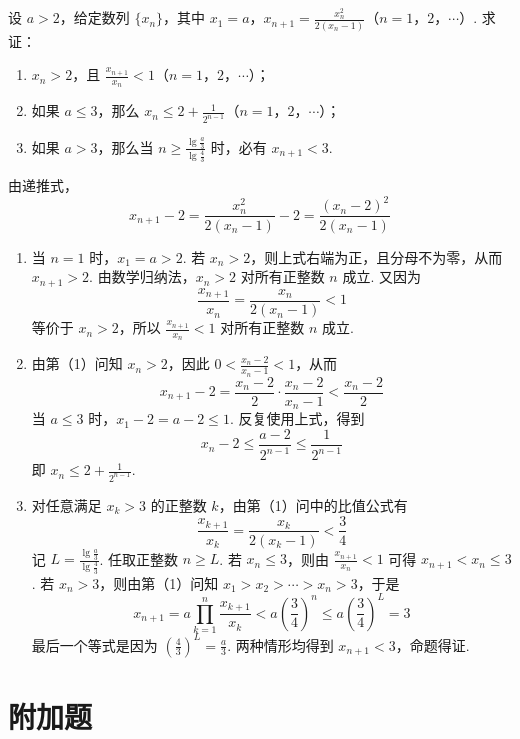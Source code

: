 \documentclass[UTF8,a4paper,oneside,11pt]{ctexbook}
\begin{document}
\begin{problem}

设 \(a > 2\)，给定数列 \(\{x_n\}\)，其中 \(x_1 = a\)，\(x_{n+1} = \frac{x_n^2}{2(x_n - 1)}\)（\(n = 1\)，\(2\)，\(\cdots\)）. 求证：

\begin{enumerate}
\item \(x_n > 2\)，且 \(\frac{x_{n + 1}}{x_n} < 1\)（\(n = 1\)，\(2\)，\(\cdots\)）；
\item 如果 \(a \leqslant 3\)，那么 \(x_n \leqslant 2 + \frac{1}{2^{n - 1}}\)（\(n = 1\)，\(2\)，\(\cdots\)）；
\item 如果 \(a > 3\)，那么当 \(n \geqslant \frac{\lg \frac{a}{3}}{\lg \frac{4}{3}}\) 时，必有 \(x_{n + 1} < 3\).
\end{enumerate}
\end{problem}

\begin{solution}
由递推式，
\[
x_{n+1}-2=\frac{x_n^2}{2(x_n-1)}-2=\frac{(x_n-2)^2}{2(x_n-1)}
\]

\begin{enumerate}
\item 当 \(n=1\) 时，\(x_1=a>2\). 若 \(x_n>2\)，则上式右端为正，且分母不为零，从而 \(x_{n+1}>2\). 由数学归纳法，\(x_n>2\) 对所有正整数 \(n\) 成立. 又因为
\[
\frac{x_{n+1}}{x_n}=\frac{x_n}{2(x_n-1)}<1
\]
等价于 \(x_n>2\)，所以 \(\frac{x_{n+1}}{x_n}<1\) 对所有正整数 \(n\) 成立.
\item 由第（1）问知 \(x_n>2\)，因此 \(0<\frac{x_n-2}{x_n-1}<1\)，从而
\[
x_{n+1}-2=\frac{x_n-2}{2}\cdot\frac{x_n-2}{x_n-1}<\frac{x_n-2}{2}
\]
当 \(a\leqslant3\) 时，\(x_1-2=a-2\leqslant1\). 反复使用上式，得到
\[
x_n-2\leqslant\frac{a-2}{2^{n-1}}\leqslant\frac{1}{2^{n-1}}
\]
即 \(x_n\leqslant2+\frac{1}{2^{n-1}}\).
\item 对任意满足 \(x_k>3\) 的正整数 \(k\)，由第（1）问中的比值公式有
\[
\frac{x_{k+1}}{x_k}=\frac{x_k}{2(x_k-1)}<\frac34
\]
记 \(L=\frac{\lg\frac{a}{3}}{\lg\frac43}\). 任取正整数 \(n\geqslant L\). 若 \(x_n\leqslant3\)，则由 \(\frac{x_{n+1}}{x_n}<1\) 可得 \(x_{n+1}<x_n\leqslant3\). 若 \(x_n>3\)，则由第（1）问知 \(x_1>x_2>\cdots>x_n>3\)，于是
\[
x_{n+1}=a\prod_{k=1}^{n}\frac{x_{k+1}}{x_k}<a\left(\frac34\right)^n\leqslant a\left(\frac34\right)^L=3
\]
最后一个等式是因为 \(\left(\frac43\right)^L=\frac{a}{3}\). 两种情形均得到 \(x_{n+1}<3\)，命题得证.
\end{enumerate}
\end{solution}

\section{附加题}
\end{document}

